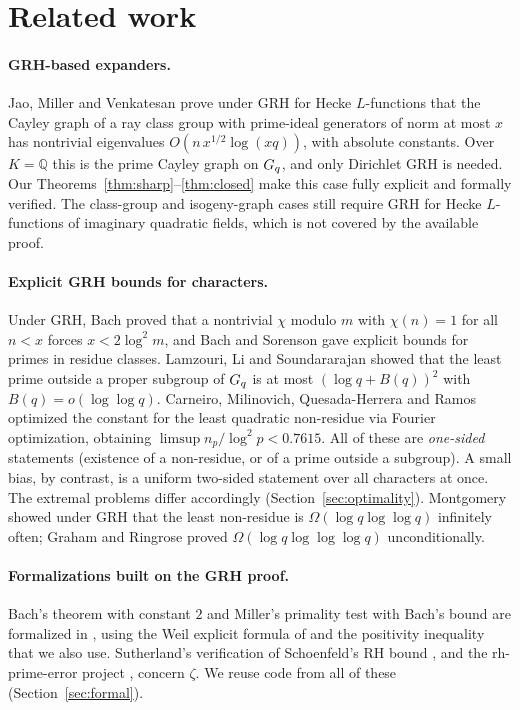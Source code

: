 \section{Related work}\label{sec:related}

\paragraph{GRH-based expanders.}
Jao, Miller and Venkatesan \cite{jmv2009} prove under GRH for Hecke $L$-functions that the Cayley graph of a
ray class group with prime-ideal generators of norm at most $x$ has nontrivial eigenvalues
$O(n\,x^{1/2}\log(xq))$, with absolute constants. Over $K=\mathbb Q$ this is the prime Cayley graph on
$G_q$, and only Dirichlet GRH is needed. Our Theorems~\ref{thm:sharp}--\ref{thm:closed} make this case
fully explicit and formally verified. The class-group and isogeny-graph cases still require GRH for Hecke
$L$-functions of imaginary quadratic fields, which is not covered by the available proof.

\paragraph{Explicit GRH bounds for characters.}
Under GRH, Bach \cite{bach1990} proved that a nontrivial $\chi$ modulo $m$ with $\chi(n)=1$ for all $n<x$
forces $x<2\log^2m$, and Bach and Sorenson \cite{bachsorenson1996} gave explicit bounds for primes in
residue classes. Lamzouri, Li and Soundararajan \cite{lls2015} showed that the least prime outside a proper
subgroup of $G_q$ is at most $(\log q+B(q))^2$ with $B(q)=o(\log\log q)$. Carneiro, Milinovich,
Quesada-Herrera and Ramos \cite{cmqr2024} optimized the constant for the least quadratic non-residue via
Fourier optimization, obtaining $\limsup n_p/\log^2p<0.7615$. All of these are \emph{one-sided} statements
(existence of a non-residue, or of a prime outside a subgroup). A small bias, by contrast, is a uniform
two-sided statement over all characters at once. The extremal problems differ accordingly
(Section~\ref{sec:optimality}). Montgomery \cite{montgomery1971} showed under GRH that the least
non-residue is $\Omega(\log q\log\log q)$ infinitely often; Graham and Ringrose \cite{grahamringrose1990}
proved $\Omega(\log q\log\log\log q)$ unconditionally.

\paragraph{Formalizations built on the GRH proof.}
Bach's theorem with constant $2$ and Miller's primality test with Bach's bound are formalized in
\cite{grhmiller}, using the Weil explicit formula of \cite{zeta23} and the positivity inequality that we
also use. Sutherland's verification of Schoenfeld's RH bound \cite{schoenfeldlean}, and the
rh-prime-error project \cite{rhprimeerror}, concern $\zeta$. We reuse code from all of these
(Section~\ref{sec:formal}).

